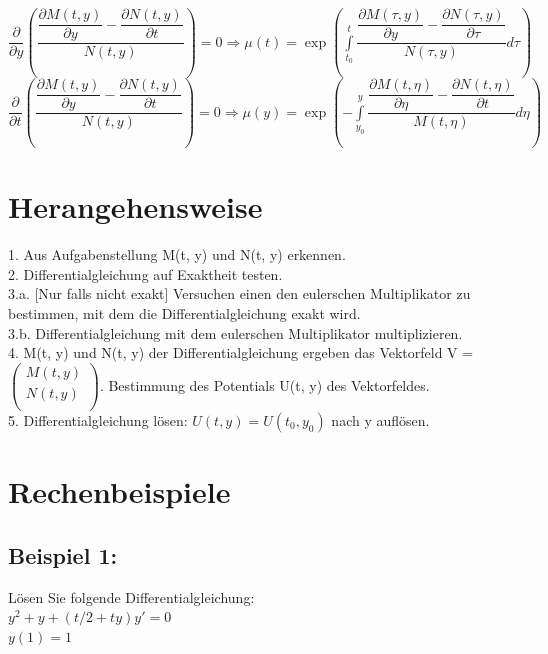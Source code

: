 \documentclass[11pt,final]{scrreprt}
\begin{document}
$ \dfrac{\partial}{\partial y} \left( \dfrac{\dfrac{\partial M(t, y)}{\partial y}-\dfrac{\partial N(t, y)}{\partial t}}{N(t, y)} \right) = 0 \Rightarrow \mu(t) = \exp \left( \int\limits_{t_0}^t \dfrac{\dfrac{\partial M(\tau, y)}{\partial y}-\dfrac{\partial N(\tau, y)}{\partial \tau}}{N(\tau, y)} d\tau\right)$\\

$ \dfrac{\partial}{\partial t} \left( \dfrac{\dfrac{\partial M(t, y)}{\partial y}-\dfrac{\partial N(t, y)}{\partial t}}{N(t, y)} \right) = 0 \Rightarrow \mu(y) = \exp \left( -\int\limits_{y_0}^y \dfrac{\dfrac{\partial M(t, \eta)}{\partial \eta}-\dfrac{\partial N(t, \eta)}{\partial t}}{M(t, \eta)} d\eta\right)$\\
\par	
\endgroup 

\section{Herangehensweise}

1. Aus Aufgabenstellung M(t, y) und N(t, y) erkennen.\\

2. Differentialgleichung auf Exaktheit testen.\\

3.a. [Nur falls nicht exakt] Versuchen einen den eulerschen Multiplikator zu bestimmen, mit dem die Differentialgleichung exakt wird.\\

3.b. Differentialgleichung mit dem eulerschen Multiplikator multiplizieren.\\

4. M(t, y) und N(t, y) der Differentialgleichung ergeben das Vektorfeld  V = $\left(\begin{array}{c}M(t, y) \\ N(t, y) \\\end{array}\right)$. Bestimmung des Potentials U(t, y) des Vektorfeldes.\\

5. Differentialgleichung lösen: $U(t, y) = U(t_0, y_0)$ nach y auflösen.\\

\section{Rechenbeispiele}

\subsection{Beispiel 1:}
Lösen Sie folgende Differentialgleichung:\\
$ y^2+y+(t/2+ty)y' = 0 $\\
$ y(1) = 1$\\
\end{document}
